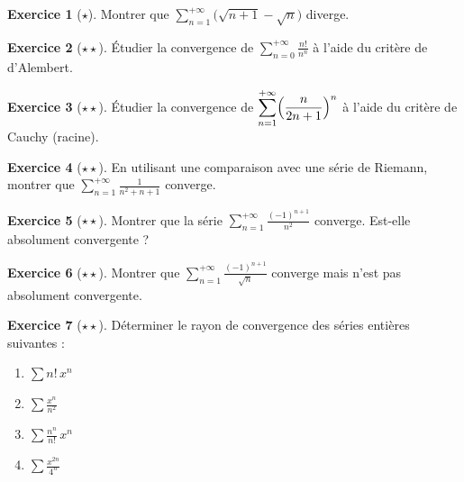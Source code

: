 \documentclass[12pt,a4paper,openany]{book}
\theoremstyle{definition}
\newtheorem{exercice}{Exercice}[chapter]
\begin{document}
\begin{exercice}[$\star$]\label{exo:telescopique-sqrt}
  Montrer que $\displaystyle\sum_{n=1}^{+\infty} \bigl(\sqrt{n+1} - \sqrt{n}\bigr)$ diverge.
\end{exercice}

\begin{exercice}[$\star\star$]\label{exo:dalembert-facto}
  Étudier la convergence de $\displaystyle\sum_{n=0}^{+\infty} \frac{n!}{n^n}$
  à l'aide du critère de d'Alembert.
\end{exercice}

\begin{exercice}[$\star\star$]\label{exo:cauchy-racine-exo}
  Étudier la convergence de $\displaystyle\sum_{n=1}^{+\infty} \Bigl(\frac{n}{2n+1}\Bigr)^n$
  à l'aide du critère de Cauchy (racine).
\end{exercice}

\begin{exercice}[$\star\star$]\label{exo:riemann-comparaison}
  En utilisant une comparaison avec une série de Riemann, montrer que
  $\displaystyle\sum_{n=1}^{+\infty} \frac{1}{n^2 + n + 1}$ converge.
\end{exercice}

\begin{exercice}[$\star\star$]\label{exo:leibniz-application}
  Montrer que la série $\displaystyle\sum_{n=1}^{+\infty} \frac{(-1)^{n+1}}{n^2}$ converge.
  Est-elle absolument convergente ?
\end{exercice}

\begin{exercice}[$\star\star$]\label{exo:abs-cv-non-reciproque}
  Montrer que $\displaystyle\sum_{n=1}^{+\infty} \frac{(-1)^{n+1}}{\sqrt{n}}$ converge
  mais n'est pas absolument convergente.
\end{exercice}

\begin{exercice}[$\star\star$]\label{exo:rayon-cv}
  Déterminer le rayon de convergence des séries entières suivantes :
  \begin{enumerate}[label=(\alph*)]
    \item $\displaystyle\sum n!\, x^n$ \qquad
    \item $\displaystyle\sum \frac{x^n}{n^2}$ \qquad
    \item $\displaystyle\sum \frac{n^n}{n!}\, x^n$ \qquad
    \item $\displaystyle\sum \frac{x^{2n}}{4^n}$
  \end{enumerate}
\end{exercice}
\end{document}
